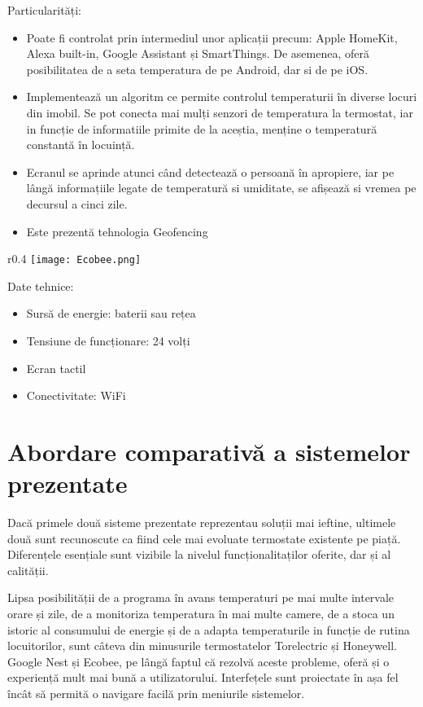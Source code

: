 	Particularități:
	\begin{itemize}
	\setlength{\itemindent}{2em}
		\itemsep0em
		\item Poate fi controlat prin intermediul unor aplicații precum: Apple HomeKit, Alexa built-in, Google Assistant și SmartThings. De asemenea, oferă posibilitatea de a seta temperatura de pe Android, dar si de pe iOS.
		\item Implementează un algoritm ce permite controlul temperaturii în diverse locuri din imobil. Se pot conecta mai mulți senzori de temperatura la termostat, iar in funcție de informatiile primite de la aceștia, menține o temperatură constantă în locuință.
		\item Ecranul se aprinde atunci când detectează o persoană în apropiere, iar pe lângă informațiile legate de temperatură si umiditate, se afișează si vremea pe decursul a cinci zile.
		\item Este prezentă tehnologia Geofencing
	\end{itemize}

\vspace{2em}

\begin{wrapfigure}[5]{r}{0.4\textwidth}
\centering
\texttt{[image: Ecobee.png]}
\end{wrapfigure}
	Date tehnice:
	\begin{itemize}
	\setlength{\itemindent}{2em}
		\itemsep0em
		\item Sursă de energie: baterii sau rețea
		\item Tensiune de funcționare: 24 volți
		\item Ecran tactil
		\item Conectivitate: WiFi
	\end{itemize}
\vspace{2em}

\section{Abordare comparativă a sistemelor prezentate}
	Dacă primele două sisteme prezentate reprezentau soluții mai ieftine, ultimele două sunt recunoscute ca fiind cele mai evoluate termostate existente pe piață. Diferențele esențiale sunt vizibile la nivelul funcționalitaților oferite, dar și al calității.

	Lipsa posibilității de a programa în avans temperaturi pe mai multe intervale orare și zile, de a monitoriza temperatura în mai multe camere, de a stoca un istoric al consumului de energie și de a adapta temperaturile in funcție de rutina locuitorilor, sunt câteva din minusurile termostatelor Torelectric și Honeywell. Google Nest și Ecobee, pe lângă faptul că rezolvă aceste probleme, oferă și o experiență mult mai bună a utilizatorului. Interfețele sunt proiectate în așa fel încât să permită o navigare facilă prin meniurile sistemelor.  

